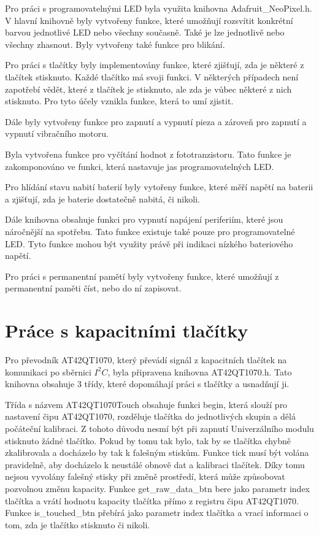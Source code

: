 Pro práci s programovatelnými LED byla využita knihovna Adafruit\_NeoPixel.h. V hlavní knihovně byly vytvořeny funkce, které umožňují rozsvítit konkrétní barvou jednotlivé LED nebo všechny současně. Také 
je lze jednotlivě nebo všechny zhasnout. Byly vytvořeny také funkce pro blikání. 

Pro práci s tlačítky byly implementovány funkce, které zjišťují, zda je některé z tlačítek stisknuto. Každé tlačítko má svoji funkci. V některých případech není zapotřebí vědět, které z tlačítek je stisknuto, 
ale zda je vůbec některé z nich stisknuto. Pro tyto účely vznikla funkce, která to umí zjistit. 

Dále byly vytvořeny funkce pro zapnutí a vypnutí pieza a zároveň pro zapnutí a vypnutí vibračního motoru. 

Byla vytvořena funkce pro vyčítání hodnot z fototranzistoru. Tato funkce je zakomponováno ve funkci, která nastavuje jas programovatelných LED.

Pro hlídání stavu nabití baterií byly vytořeny funkce, které měří napětí na baterii a zjišťují, zda je baterie dostatečně nabitá, či nikoli. 

Dále knihovna obsahuje funkci pro vypnutí napájení periferiím, které jsou náročnější na spotřebu. Tato funkce existuje také pouze pro programovatelné LED. Tyto funkce mohou být využity právě při indikaci 
nízkého bateriového napětí.

Pro práci s permanentní pamětí byly vytvořeny funkce, které umožňují z permanentní paměti číst, nebo do ní zapisovat. 

\section{Práce s kapacitními tlačítky}
Pro převodník AT42QT1070, který převádí signál z kapacitních tlačítek na komunikaci po sběrnici $I^2C$, byla připravena knihovna AT42QT1070.h. Tato knihovna obsahuje 3 třídy, které dopomáhají 
práci s tlačítky a usnadňují ji. 

Třída s názvem AT42QT1070Touch obsahuje funkci begin, která slouží pro nastavení čipu AT42QT1070, rozděluje tlačítka do jednotlivých skupin a dělá počáteční kalibraci. Z tohoto důvodu nesmí být při 
zapnutí Univerzálního modulu stisknuto žádné tlačítko. Pokud by tomu tak bylo, tak by se tlačítka chybně zkalibrovala a docházelo by tak k falešným stiskům. Funkce tick musí být volána pravidelně, aby docházelo 
k neustálé obnově dat a kalibraci tlačítek. Díky tomu nejsou vyvolány falešný stisky při změně prostředí, která může způsobovat pozvolnou změnu kapacity. Funkce get\_raw\_data\_btn bere jako parametr 
index tlačítka a vrátí hodnotu kapacity tlačítka přímo z registru čipu AT42QT1070. Funkce is\_touched\_btn přebírá jako parametr index tlačítka a vrací informaci o tom, zda je tlačítko stisknuto 
či nikoli.  

